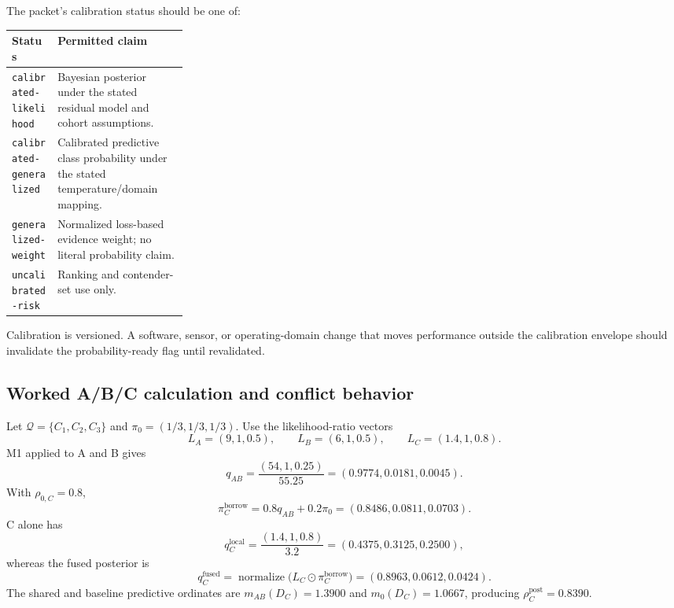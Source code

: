 \documentclass[11pt]{article}
\begin{document}
    The packet's calibration status should be one of:
    \begin{center}
        \small
        \begin{tabularx}{0.95\linewidth}{@{}p{0.26\linewidth}Y@{}}
\toprule
Status & Permitted claim \\
\midrule
\texttt{calibrated-likelihood} & Bayesian posterior under the stated residual model and cohort assumptions. \\
\texttt{calibrated-generalized} & Calibrated predictive class probability under the stated temperature/domain mapping. \\
\texttt{generalized-weight} & Normalized loss-based evidence weight; no literal probability claim. \\
\texttt{uncalibrated-risk} & Ranking and contender-set use only. \\
\bottomrule
        \end{tabularx}
    \end{center}
    Calibration is versioned. A software, sensor, or operating-domain change that moves
    performance outside the calibration envelope should invalidate the probability-ready
    flag until revalidated.

    \subsection{Worked A/B/C calculation and conflict behavior}

    Let $\mathcal Q=\{C_1,C_2,C_3\}$ and $\pi_0=(1/3,1/3,1/3)$. Use the likelihood-ratio
    vectors
    \begin{equation}
        L_A=(9,1,0.5),
        \qquad
        L_B=(6,1,0.5),
        \qquad
        L_C=(1.4,1,0.8).
    \end{equation}
    M1 applied to A and B gives
    \begin{equation}
        q_{AB}
        =\frac{(54,1,0.25)}{55.25}
        =(0.9774,0.0181,0.0045).
    \end{equation}
    With $\rho_{0,C}=0.8$,
    \begin{equation}
        \pi_C^{\mathrm{borrow}}
        =0.8q_{AB}+0.2\pi_0
        =(0.8486,0.0811,0.0703).
    \end{equation}
    C alone has
    \begin{equation}
        q_C^{\mathrm{local}}
        =\frac{(1.4,1,0.8)}{3.2}
        =(0.4375,0.3125,0.2500),
    \end{equation}
    whereas the fused posterior is
    \begin{equation}
        q_C^{\mathrm{fused}}
        =\operatorname{normalize}
        \bigl(L_C\odot\pi_C^{\mathrm{borrow}}\bigr)
        =(0.8963,0.0612,0.0424).
    \end{equation}
    The shared and baseline predictive ordinates are
    $m_{AB}(D_C)=1.3900$ and $m_0(D_C)=1.0667$, producing
    $\rho_C^{\mathrm{post}}=0.8390$.
\end{document}
